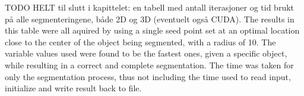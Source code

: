  
TODO 
HELT til slutt i kapittelet: en tabell med antall iterasjoner og tid brukt på alle segmenteringene, både 2D og 3D (eventuelt også CUDA). The results in this table were all aquired by using a single seed point set at an optimal location close to the center of the object being segmented, with a radius of 10. The variable values used were found to be the fastest ones, given a specific object, while resulting in a correct and complete segmentation. The time was taken for only the segmentation process, thus not including the time used to read input, initialize and write result back to file.